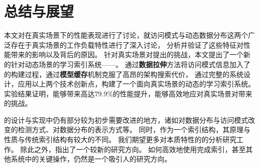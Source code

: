 \chapter{总结与展望}
\label{chap:concl}

本文对{\li}在真实场景下的性能表现进行了讨论，就访问模式与动态数据分布这两个广泛存在于真实场景的工作负载特性进行了深入讨论，
分析并验证了这些特征对{\li}性能带来的影响以及背后的原因。
针对真实场景对{\li}提出的挑战，本文提出了一个新的针对动态场景的学习索引系统{------}{\sys}。
通过\textbf{数据拉伸}方法{\sys}将访问模式信息加入了{\li}的构建过程，通过\textbf{模型缓存}机制{\sys}克服了高昂的{\li}架构搜索代价，
通过完整的系统设计，{\sys}应用以上两个技术创新点，构建了一个面向真实场景的动态的学习索引系统。
实验结果证明，{\sys}能够带来高达79.9\%的性能提升，能够高效地应对真实场景对{\li}带来的挑战。


{\sys}的设计与实现中仍有部分较为初步需要改进的地方，诸如对数据分布与访问模式改变的检测方式、对数据分布的表示方式等。
同时，{\li}作为一个索引结构，其原理与性质与传统索引结构有较大的不同。
我们期望更多对{\li}本质特性的的分析研究工作。
除此之外，{\li}指出了一个较新的研究方向。
如何高效地使用{\model}完成索引，甚至其他系统中的关键操作，仍然是一个吸引人的研究方向。
